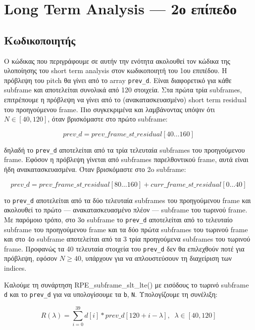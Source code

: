 \documentclass{article}
\begin{document}
\section{Long Term Analysis --- 2ο επίπεδο}

\subsection{Κωδικοποιητής}\label{lt_coder}
Ο κώδικας που περιγράφουμε σε αυτήν την ενότητα ακολουθεί τον
κώδικα της υλοποίησης του short term analysis
στον κωδικοποιητή του 1ου επιπέδου. Η πρόβλεψη του pitch θα
γίνει από το array \verb|prev_d|. Είναι διαφορετικό για κάθε subframe και
αποτελείται συνολικά από 120 στοιχεία. Στα πρώτα τρία subframes,
επιτρέπουμε η πρόβλεψη να γίνει από το (ανακατα\-σκευασμέ\-νο)
short term residual του προηγούμενου frame. Πιο συγκεκριμένα και
λαμβάνοντας υπόψιν ότι $N \in [40,120]$, όταν βρισκόμαστε στο
πρώτο subframe: 

\begin{equation}
    prev\_d = prev\_frame\_st\_residual[40\ldots160]
    \label{prev_d}
\end{equation}

δηλα\-δή το \verb|prev_d| αποτελείται από τα τρία τελευταία subframes του
προηγούμενου frame. Εφόσον η πρόβλεψη γίνεται από subframes
παρελθοντικού frame, αυτά είναι ήδη ανακατασκευασμένα. Όταν
βρισκόμαστε στο 2o subframe: 

\begin{equation}
    prev\_d = prev\_frame\_st\_residual[80\ldots160] + curr\_frame\_st\_residual[0\ldots40] 
\end{equation}

το \verb|prev_d| αποτε\-λείται από
τα δύο τελευταία subframes του προηγούμενου frame και 
ακολουθεί το πρώτο --- ανακατασκευασμένο πλέον --- subframe
του τωρινού frame. Με παρόμοιο τρόπο, στο 3ο subframe το \verb|prev_d|
αποτελείται από το τελευταίο subframe του προηγούμενου frame
και τα δύο πρώτα subframes του τωρινού frame και στο 4ο subframe 
αποτελείται από τα 3 τρία προηγούμενα subframes του τωρινού frame.
Προφανώς τα 40 τελευταία στοιχεία του \verb|prev_d| δεν θα επιλεχθούν 
ποτέ για πρόβλεψη, εφόσον $N \geq 40$, υπάρχουν για να 
απλουστεύσουν τη διαχείριση των indices.

Καλούμε τη συνάρτηση RPE\_subframe\_slt\_lte() με εισόδους το τωρινό 
subframe \verb|d| και το \verb|prev_d| για να υπολο\-γίσουμε τα \verb|b|, 
\verb|N|. Υπολογίζουμε τη συνέλιξη:

\begin{equation}
    R(\lambda) = \sum_{i=0}^{39} d[i] * prev\_d[120 + i - \lambda],\;\;\lambda \in [40,120]
\end{equation}
\end{document}
